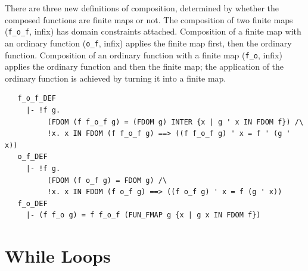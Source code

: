 {There are three new definitions of composition, determined by whether
the composed functions are finite maps or not. The composition of two
finite maps (\verb+f_o_f+, infix) has domain constraints
attached. Composition of a finite map with an ordinary function
(\verb+o_f+, infix) applies the finite map first, then the ordinary
function.  Composition of an ordinary function with a finite map
(\verb+f_o+, infix) applies the ordinary function and then the finite
map; the application of the ordinary function is achieved by turning
it into a finite map.
%
\begin{hol}
\begin{verbatim}
   f_o_f_DEF
     |- !f g.
          (FDOM (f f_o_f g) = (FDOM g) INTER {x | g ' x IN FDOM f}) /\
          !x. x IN FDOM (f f_o_f g) ==> ((f f_o_f g) ' x = f ' (g ' x))
   o_f_DEF
     |- !f g.
          (FDOM (f o_f g) = FDOM g) /\
          !x. x IN FDOM (f o_f g) ==> ((f o_f g) ' x = f (g ' x))
   f_o_DEF
     |- (f f_o g) = f f_o_f (FUN_FMAP g {x | g x IN FDOM f})
\end{verbatim}
\end{hol}

\section{While Loops}
\label{sec:while-loops}

}
